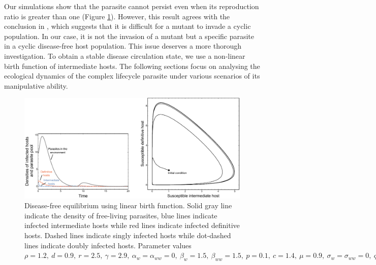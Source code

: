 \documentclass[11pt]{article}
\begin{document}
Our simulations show that the parasite cannot persist even when its reproduction ratio is greater than one (Figure \ref{fig:diseasefree:linear}). However, this result agrees with the conclusion in \cite{Ripa:Evol:2013}, which suggests that it is difficult for a mutant to invade a cyclic population. 
In our case, it is not the invasion of a mutant but a specific parasite in a cyclic disease-free host population. 
This issue deserves a more thorough investigation. 
To obtain a stable disease circulation state, we use a non-linear birth function of intermediate hosts. 
The following sections focus on analysing the ecological dynamics of the complex lifecycle parasite under various scenarios of its manipulative ability.

\begin{figure}
\includegraphics[width=\textwidth]{Figures/diseasefree_linear.pdf}
\caption{Disease-free equilibrium using linear birth function. Solid gray line indicate the density of free-living parasites, blue lines indicate infected intermediate hosts while red lines indicate infected definitive hosts. Dashed lines indicate singly infected hosts while dot-dashed lines indicate doubly infected hosts. Parameter values  $\rho = 1.2, \  d = 0.9, \  r = 2.5, \ \gamma = 2.9, \ \alpha_w =  \alpha_{ww} =  0, \ \beta_w  = 1.5, \ \beta_{ww} = 1.5, \ p = 0.1,  \ c = 1.4, \ \mu = 0.9,  \ \sigma_w = \sigma_{ww} = 0, \ q = 0.01, \  f_w = 6.5, \  f_{ww} = 7.5, \ \delta = 0.9$ } 
\label{fig:diseasefree:linear}
\end{figure}
\end{document}
